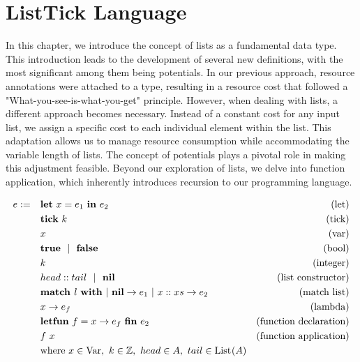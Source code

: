 \chapter{ListTick Language}\label{chap:list-tick}

In this chapter, we introduce the concept of lists as a fundamental data type. This introduction leads to the development of several new definitions, with the most significant among them being potentials. In our previous approach, resource annotations were attached to a type, resulting in a resource cost that followed a "What-you-see-is-what-you-get" principle. However, when dealing with lists, a different approach becomes necessary. Instead of a constant cost for any input list, we assign a specific cost to each individual element within the list. This adaptation allows us to manage resource consumption while accommodating the variable length of lists. The concept of potentials plays a pivotal role in making this adjustment feasible. Beyond our exploration of lists, we delve into function application, which inherently introduces recursion to our programming language. 

\begin{definition}
   \label{def:prog-lang-6}

\begin{align*}
   e := ~~~ & \mathbf{let}~x = e_1~\mathbf{in}~e_2		& \text{(let)}\\
            & \mathbf{tick}~k				& \text{(tick)}\\
	    & x					& \text{(var)}\\
	    & \mathbf{true} ~~| ~~\mathbf{false}		& \text{(bool)}\\
	    & k					& \text{(integer)}\\
            & head :: tail ~~| ~~ \textbf{nil} & \text{(list constructor)}\\
            & \textbf{match } l~\textbf{with}~|~\textbf{nil} \to e_1~|~x :: xs \to e_2           & \text{(match list)}\\
            & x \to e_f                    & \text{(lambda)} \\
            & \textbf{letfun}~f = x \to e_f~\textbf{fin}~e_2           & \text{(function declaration)} \\
            & f~x                               & \text{(function application)}\\
            & \text{where } x \in \text{Var},~k \in \mathbb{Z},~ head \in A,~ tail \in \text{List}^{}(A)
\end{align*}
\end{definition}

